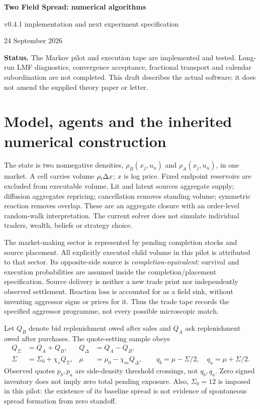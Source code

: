 \documentclass[11pt,a4paper]{article}
\begin{document}
\begin{center}
{\Large\bfseries Two Field Spread: numerical algorithms}\par
{\large v0.4.1 implementation and next experiment specification}\par
24 September 2026
\end{center}
\textbf{Status.} The Markov pilot and execution tape are implemented and tested.
Long-run LMF diagnostics, convergence acceptance, fractional transport and
calendar subordination are not completed. This draft describes the actual
software; it does not amend the supplied theory paper or letter.

\section{Model, agents and the inherited numerical construction}
The state is two nonnegative densities, $\rho_B(x_j,u_n)$ and
$\rho_A(x_j,u_n)$, in one market. A cell carries volume $\rho_i\Delta x$;
$x$ is log price. Fixed endpoint reservoirs are excluded from executable
volume. Lit and latent sources aggregate supply; diffusion aggregates
repricing; cancellation removes standing volume; symmetric reaction removes
overlap. These are an aggregate closure with an order-level random-walk
interpretation. The current solver does not simulate individual traders,
wealth, beliefs or strategy choice.

The market-making sector is represented by pending completion stocks and
source placement. All explicitly executed child volume in this pilot is
attributed to that sector. Its opposite-side source is
\emph{completion-equivalent}: survival and execution probabilities are
assumed inside the completion/placement specification. Source delivery is
neither a new trade print nor independently observed settlement. Reaction
loss is accounted for as a field sink, without inventing aggressor signs or
prices for it. Thus the trade tape records the specified aggressor programme,
not every possible microscopic match.

Let $Q_B$ denote bid replenishment owed after sales and $Q_A$ ask
replenishment owed after purchases. The quote-setting sample obeys
\begin{align}
 Q_\Sigma&=Q_A+Q_B,& Q_\Delta&=Q_A-Q_B,\\
 \Sigma&=\Sigma_0+\chi_s Q_\Sigma,&
 \mu&=\mu_0-\chi_m Q_\Delta,\qquad
 q_b=\mu-\Sigma/2,\quad q_a=\mu+\Sigma/2.
\end{align}
Observed quotes $p_b,p_a$ are side-density threshold crossings, not $q_b,q_a$.
Zero signed inventory does not imply zero total pending exposure. Also,
$\Sigma_0=12$ is imposed in this pilot: the existence of its baseline spread
is not evidence of spontaneous spread formation from zero standoff.
\end{document}
